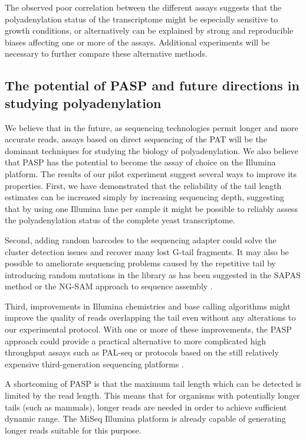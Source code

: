 \documentclass[10pt]{article}
\begin{document}
The observed poor correlation between the different assays suggests that the polyadenylation status of the transcriptome might be especially sensitive to growth conditions, or alternatively can be explained by strong and reproducible biases affecting one or more of the assays. 
Additional experiments will be necessary to further compare these alternative methods.

\subsection*{The potential of PASP and future directions in studying polyadenylation}

We believe that in the future, as sequencing technologies permit longer and more accurate reads, assays based on direct sequencing of the PAT will be the dominant techniques for studying the biology of polyadenylation. We also believe that PASP has the potential to become the assay of choice on the Illumina platform.  The results of our pilot experiment suggest several ways to improve its properties. First, we have demonstrated that the reliability of the tail length estimates can be increased simply by increasing sequencing depth, suggesting that by using one Illumina lane per sample it might be possible to reliably assess the polyadenylation status of the complete yeast transcriptome. 

Second, adding random barcodes to the sequencing adapter could solve the cluster detection issues and recover many lost G-tail fragments.  It may also be possible to ameliorate sequencing problems caused by the repetitive tail by introducing random mutations in the library as has been suggested in the SAPAS method \cite{fu11} or the NG-SAM approach to sequence assembly \cite{sipos12}.

Third, improvements in Illumina chemistries and base calling algorithms might improve the quality of reads overlapping the tail even without any alterations to our experimental protocol. With one or more of these improvements, the PASP approach could provide a practical alternative to more complicated high throughput assays such as PAL-seq or protocols based on the still relatively expensive third-generation sequencing platforms \cite{sharon13}.

A shortcoming of PASP is that the maximum tail length which can be detected is limited by the read length. This means that for organisms with potentially longer tails (such as mammals), longer reads are needed in order to achieve sufficient dynamic range. The MiSeq Illumina platform is already capable of generating longer reads suitable for this purpose.
\end{document}
